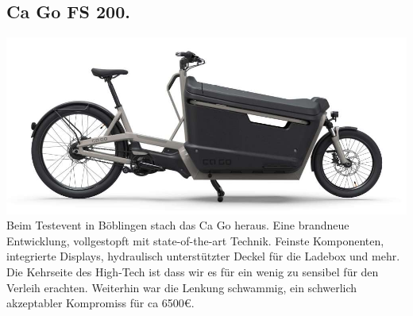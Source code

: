 \documentclass[a4paper,ngerman, 14pt] {scrartcl}
\begin{document}
\subsection{Ca Go FS 200.}

\includegraphics[scale=0.54]{ca_go.png}\\
Beim Testevent in Böblingen stach das Ca Go heraus. Eine brandneue Entwicklung, vollgestopft mit state-of-the-art Technik. Feinste Komponenten, integrierte Displays, hydraulisch unterstützter Deckel für die Ladebox und mehr.\\
Die Kehrseite des High-Tech ist dass wir es für ein wenig zu sensibel für den Verleih erachten. Weiterhin war die Lenkung schwammig, ein schwerlich akzeptabler Kompromiss für ca 6500€.
\end{document}
